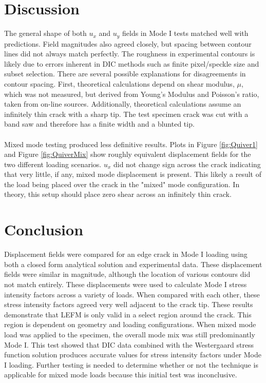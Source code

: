 \documentclass[12pt]{article}
\begin{document}
\section{Discussion}%
The general shape of both $u_x$ and $u_y$ fields in Mode I tests matched well with predictions. Field magnitudes also agreed closely, but spacing between contour lines did not always match perfectly. The roughness in experimental contours is likely due to errors inherent in DIC methods such as finite pixel/speckle size and subset selection. There are several possible explanations for disagreements in contour spacing. First, theoretical calculations depend on shear modulus, $\mu$, which was not measured, but derived from Young's Modulus and Poisson's ratio, taken from on-line sources. Additionally, theoretical calculations assume an infinitely thin crack with a sharp tip. The test specimen crack was cut with a band saw and therefore has a finite width and a blunted tip. 
\\ \\
Mixed mode testing produced less definitive results. Plots in Figure \ref{fig:Quiver1} and Figure \ref{fig:QuiverMix} show roughly equivalent displacement fields for the two different loading scenarios. $u_x$ did not change sign across the crack indicating that very little, if any, mixed mode displacement is present. This likely a result of the load being placed over the crack in the "mixed" mode configuration. In theory, this setup should place zero shear across an infinitely thin crack.  


\section{Conclusion}%

Displacement fields were compared for an edge crack in Mode I loading using both a closed form analytical solution and experimental data. These displacement fields were similar in magnitude, although the location of various contours did not match entirely. These displacements were used to calculate Mode I stress intensity factors across a variety of loads. When compared with each other, these stress intensity factors agreed very well adjacent to the crack tip. These results demonstrate that LEFM is only valid in a select region around the crack. This region is dependent on geometry and loading configurations. When mixed mode load was applied to the specimen, the overall mode mix was still predominantly Mode I. This test showed that DIC data combined with the Westergaard stress function solution produces accurate values for stress intensity factors under Mode I loading. Further testing is needed to determine whether or not the technique is applicable for mixed mode loads because this initial test was inconclusive.
\end{document}
